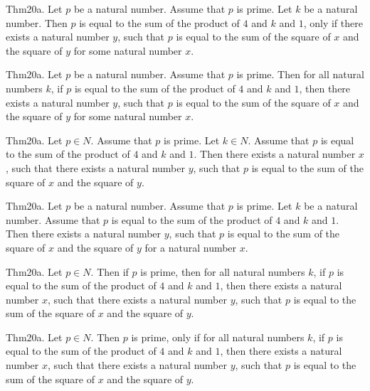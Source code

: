 \documentclass{article}
\begin{document}
Thm20a. Let $p$ be a natural number. Assume that $p$ is prime. Let $k$ be a natural number. Then $p$ is equal to the sum of the product of $4$ and $k$ and $1$, only if there exists a natural number $y$, such that $p$ is equal to the sum of the square of $x$ and the square of $y$ for some natural number $x$.

Thm20a. Let $p$ be a natural number. Assume that $p$ is prime. Then for all natural numbers $k$, if $p$ is equal to the sum of the product of $4$ and $k$ and $1$, then there exists a natural number $y$, such that $p$ is equal to the sum of the square of $x$ and the square of $y$ for some natural number $x$.

Thm20a. Let $p \in N$. Assume that $p$ is prime. Let $k \in N$. Assume that $p$ is equal to the sum of the product of $4$ and $k$ and $1$. Then there exists a natural number $x$, such that there exists a natural number $y$, such that $p$ is equal to the sum of the square of $x$ and the square of $y$.

Thm20a. Let $p$ be a natural number. Assume that $p$ is prime. Let $k$ be a natural number. Assume that $p$ is equal to the sum of the product of $4$ and $k$ and $1$. Then there exists a natural number $y$, such that $p$ is equal to the sum of the square of $x$ and the square of $y$ for a natural number $x$.

Thm20a. Let $p \in N$. Then if $p$ is prime, then for all natural numbers $k$, if $p$ is equal to the sum of the product of $4$ and $k$ and $1$, then there exists a natural number $x$, such that there exists a natural number $y$, such that $p$ is equal to the sum of the square of $x$ and the square of $y$.

Thm20a. Let $p \in N$. Then $p$ is prime, only if for all natural numbers $k$, if $p$ is equal to the sum of the product of $4$ and $k$ and $1$, then there exists a natural number $x$, such that there exists a natural number $y$, such that $p$ is equal to the sum of the square of $x$ and the square of $y$.
\end{document}
